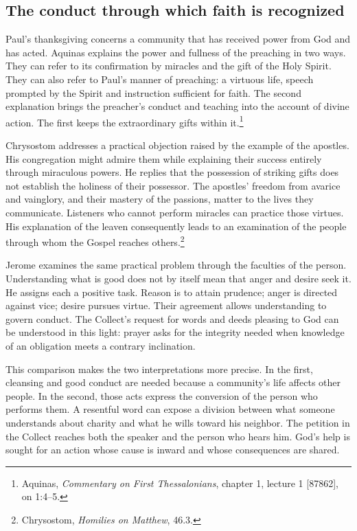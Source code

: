 \subsection{The conduct through which faith is recognized}

Paul's thanksgiving concerns a community that has received power from God and has acted. Aquinas explains the power and fullness of the preaching in two ways. They can refer to its confirmation by miracles and the gift of the Holy Spirit. They can also refer to Paul's manner of preaching: a virtuous life, speech prompted by the Spirit and instruction sufficient for faith. The second explanation brings the preacher's conduct and teaching into the account of divine action. The first keeps the extraordinary gifts within it.\footnote{Aquinas, \textit{Commentary on First Thessalonians}, chapter 1, lecture 1 [87862], on 1:4--5.}

Chrysostom addresses a practical objection raised by the example of the apostles. His congregation might admire them while explaining their success entirely through miraculous powers. He replies that the possession of striking gifts does not establish the holiness of their possessor. The apostles' freedom from avarice and vainglory, and their mastery of the passions, matter to the lives they communicate. Listeners who cannot perform miracles can practice those virtues. His explanation of the leaven consequently leads to an examination of the people through whom the Gospel reaches others.\footnote{Chrysostom, \textit{Homilies on Matthew}, 46.3.}

Jerome examines the same practical problem through the faculties of the person. Understanding what is good does not by itself mean that anger and desire seek it. He assigns each a positive task. Reason is to attain prudence; anger is directed against vice; desire pursues virtue. Their agreement allows understanding to govern conduct. The Collect's request for words and deeds pleasing to God can be understood in this light: prayer asks for the integrity needed when knowledge of an obligation meets a contrary inclination.

This comparison makes the two interpretations more precise. In the first, cleansing and good conduct are needed because a community's life affects other people. In the second, those acts express the conversion of the person who performs them. A resentful word can expose a division between what someone understands about charity and what he wills toward his neighbor. The petition in the Collect reaches both the speaker and the person who hears him. God's help is sought for an action whose cause is inward and whose consequences are shared.

